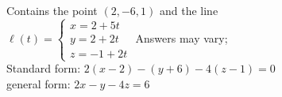 {Contains the point $(2,-6,1)$ and the line\\
$\ell(t) = \begin{cases}x=2+5t\\y=2+2t\\z=-1+2t\end{cases}$
}
{Answers may vary;\\
Standard form: $2(x-2)-(y+6)-4(z-1)=0$\\
general form: $2x-y-4z=6$
}

